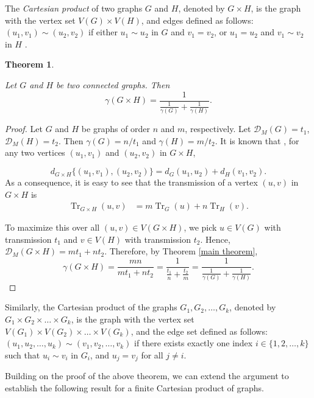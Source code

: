 \documentclass[12pt]{article}
\newtheorem{theorem}{Theorem}[section]
\DeclareMathOperator{\tr}{Tr}
\begin{document}
{{			The \textit{Cartesian product} of two graphs $G$ and $H$, denoted by $G\times H$, is the graph with the vertex set $V(G) \times V(H)$, and edges defined as follows: $(u_1,v_1) \sim (u_2,v_2)$ if either $u_1 \sim u_2$ in $G$ and $v_1=v_2$, or $u_1=u_2$ and $v_1 \sim v_2$ in $H$ \cite{hammack-product-graph}.
			
			
			\begin{theorem}{\label{graph products}}
				
				Let $G$ and $H$ be two connected graphs. Then 
				$$
				\gamma(G \times H)=\frac{1}{\frac{1}{\gamma(G)}+\frac{1}{\gamma(H)}}.
				$$
			\end{theorem}
			\begin{proof}
				Let $G$ and $H$ be graphs of order $n$ and $m$,  respectively. Let $\mathcal{D}_M(G)=t_1$, $\mathcal{D}_M(H)=t_2$. Then $\gamma(G)=n/t_1$ and $\gamma(H)=m/t_2$. It is known that \cite{hammack-product-graph}, for any two vertices $(u_1,v_1)$ and $(u_2,v_2)$ in $G\times H$, 
				
				$$
				d_{G\times H}\{(u_1,v_1),(u_2,v_2)\}=d_G(u_1,u_2)+d_H(v_1,v_2).
				$$
				As a consequence, it is easy to see that the transmission of a vertex $(u,v)$ in $G\times H$ is
				\begin{align*}
					\tr_{G\times H}(u,v)&=m\tr_G(u)+n\tr_H(v).
				\end{align*}
				
				To maximize this over all $(u,v)\in V(G\times H)$, we pick $u \in V(G)$ with transmission $t_1$ and $v \in V(H)$ with transmission $t_2$. Hence,  $\mathcal{D}_M(G \times H)=mt_1+nt_2$. Therefore, by Theorem \ref{main theorem},
				$$
				\gamma(G\times H)=\frac{mn}{mt_1+nt_2}=\frac{1}{\frac{t_1}{n}+\frac{t_2}{m}}=\frac{1}{\frac{1}{\gamma(G)}+\frac{1}{\gamma(H)}}.
				$$
			\end{proof}
			
			
			
			Similarly, the Cartesian product of the graphs $G_1,G_2,\dots,G_k$, denoted by $G_1 \times G_2 \times \dots \times G_k$, is the graph with the vertex set $V(G_1) \times V(G_2) \times \dots \times V(G_k)$, and the edge set defined as follows: $(u_1,u_2,\dots,u_k) \sim (v_1,v_2,\dots,v_k)$ if there exists exactly one index $i \in \{1,2,\dots,k\}$ such that $u_i \sim v_i$ in $G_i$, and $u_j=v_j$ for all $j \neq i$.
			
			
			Building on the proof of the above theorem, we can extend the argument to establish the following result for a finite Cartesian product of graphs.
			
}}
\end{document}
